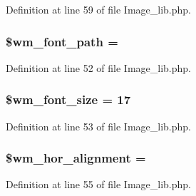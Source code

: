 Definition at line 59 of file Image\+\_\+lib.\+php.

\subsubsection[{\texorpdfstring{\$wm\+\_\+font\+\_\+path}{$wm_font_path}}]{\setlength{\rightskip}{0pt plus 5cm}\$wm\+\_\+font\+\_\+path = \textquotesingle{}\textquotesingle{}}\hypertarget{class_c_i___image__lib_a6870985f3e6bbf1a29e5875c054598f4}{}\label{class_c_i___image__lib_a6870985f3e6bbf1a29e5875c054598f4}


Definition at line 52 of file Image\+\_\+lib.\+php.

\subsubsection[{\texorpdfstring{\$wm\+\_\+font\+\_\+size}{$wm_font_size}}]{\setlength{\rightskip}{0pt plus 5cm}\$wm\+\_\+font\+\_\+size = 17}\hypertarget{class_c_i___image__lib_a0ea2a2f73623aa0631670017a4e68419}{}\label{class_c_i___image__lib_a0ea2a2f73623aa0631670017a4e68419}


Definition at line 53 of file Image\+\_\+lib.\+php.

\subsubsection[{\texorpdfstring{\$wm\+\_\+hor\+\_\+alignment}{$wm_hor_alignment}}]{\setlength{\rightskip}{0pt plus 5cm}\$wm\+\_\+hor\+\_\+alignment = \textquotesingle{}}\hypertarget{class_c_i___image__lib_a74d790b77baa0c22cd0b812abc41765c}{}\label{class_c_i___image__lib_a74d790b77baa0c22cd0b812abc41765c}


Definition at line 55 of file Image\+\_\+lib.\+php.

